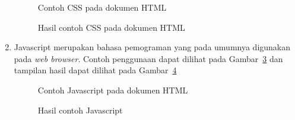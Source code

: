\begin{enumerate}
\begin{figure}[h]
{		}
		\caption[Contoh CSS pada dokumen HTML]{Contoh CSS pada dokumen HTML} 
		\label{fig:contoh_html_css}
		\end{figure}
		\begin{figure}[h]
		\centering
		\caption[Hasil contoh CSS pada dokumen HTML]{Hasil contoh CSS pada dokumen HTML} 
		\label{fig:hasil_contoh_html_css}
		\end{figure}
	\item Javascript merupakan bahasa pemograman yang pada umumnya digunakan pada \textit{web browser}. Contoh penggunaan dapat dilihat pada Gambar~\ref{fig:contoh_js} dan tampilan hasil dapat dilihat pada Gambar~\ref{fig:hasil_js}
		\begin{figure}[h]
		\centering
		\caption[Contoh Javascript pada dokumen HTML]{Contoh Javascript pada dokumen HTML} 
		\label{fig:contoh_js}
		\end{figure}
		\begin{figure}[h]
		\centering
		\caption[Hasil contoh Javascript]{Hasil contoh Javascript} 
		\label{fig:hasil_js}
		\end{figure}
\end{enumerate}


